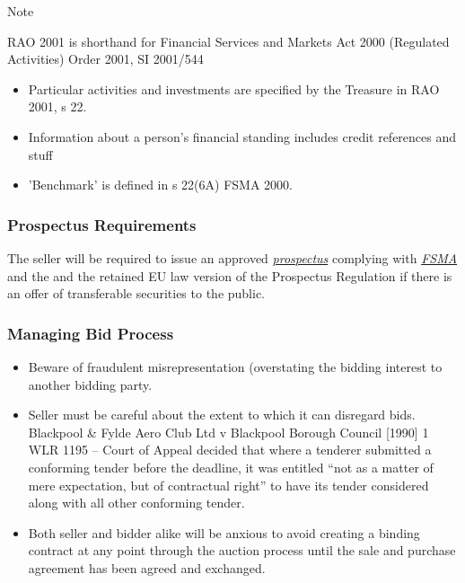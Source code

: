 \documentclass[
]{article}
\providecommand{\tightlist}{%
  \setlength{\itemsep}{0pt}\setlength{\parskip}{0pt}}
\newenvironment{env-e851f727-a00b-4cd9-88bb-15d38a5b7711}
{
    \savenotes\tcolorbox[blanker,breakable,left=5pt,borderline west={2pt}{-4pt}{blue}]
}
{
    \endtcolorbox\spewnotes
}
\begin{document}
\begin{env-e851f727-a00b-4cd9-88bb-15d38a5b7711}

Note

RAO 2001 is shorthand for Financial Services and Markets Act 2000
(Regulated Activities) Order 2001, SI 2001/544

\end{env-e851f727-a00b-4cd9-88bb-15d38a5b7711}

\begin{itemize}
\tightlist
\item
  Particular activities and investments are specified by the Treasure in
  RAO 2001, s 22.
\item
  Information about a person's financial standing includes credit
  references and stuff
\item
  'Benchmark' is defined in s 22(6A) FSMA 2000.
\end{itemize}

\hypertarget{prospectus-requirements}{%
\subsubsection{Prospectus Requirements}\label{prospectus-requirements}}

The seller will be required to issue an approved
\emph{\href{https://uk.westlaw.com/5-107-7072?originationContext=document\&transitionType=DocumentItem\&contextData=(sc.Default)\&ppcid=287b073fbf064422aba9bab6fbc11f1d}{prospectus}}
complying with
\emph{\href{https://uk.westlaw.com/5-505-5867?originationContext=document\&transitionType=PLDocumentLink\&contextData=(sc.Default)\&ppcid=287b073fbf064422aba9bab6fbc11f1d}{FSMA}}
and the and the retained EU law version of the Prospectus Regulation if
there is an offer of transferable securities to the public.

\hypertarget{managing-bid-process}{%
\subsubsection{Managing Bid Process}\label{managing-bid-process}}

\begin{itemize}
\tightlist
\item
  Beware of fraudulent misrepresentation (overstating the bidding
  interest to another bidding party.
\item
  Seller must be careful about the extent to which it can disregard
  bids. Blackpool \& Fylde Aero Club Ltd v Blackpool Borough Council
  {[}1990{]} 1 WLR 1195 -- Court of Appeal decided that where a tenderer
  submitted a conforming tender before the deadline, it was entitled
  ``not as a matter of mere expectation, but of contractual right'' to
  have its tender considered along with all other conforming tender.
\item
  Both seller and bidder alike will be anxious to avoid creating a
  binding contract at any point through the auction process until the
  sale and purchase agreement has been agreed and exchanged.
\end{itemize}
\end{document}
